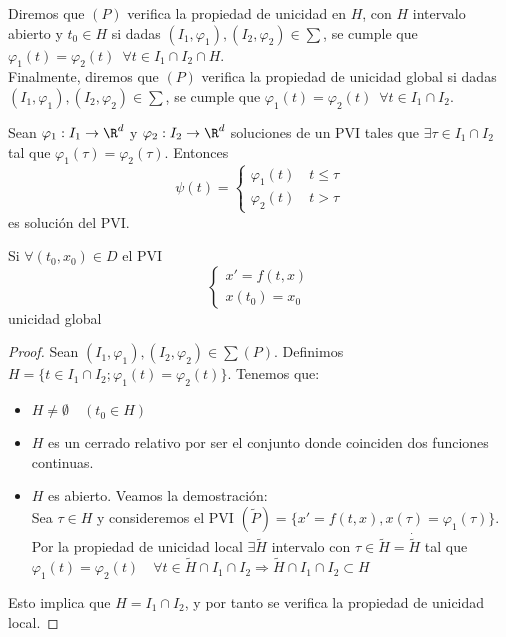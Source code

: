 \documentclass{article}
\begin{document}
Diremos que $(P)$ verifica la propiedad de unicidad en $H$, con $H$ intervalo abierto
y $t_0 \in H$ si dadas $(I_1, \varphi_1), (I_2, \varphi_2) \in \sum$, se cumple que
$\varphi_1(t) = \varphi_2(t)\,\,\, \forall t \in I_1 \cap I_2 \cap H$.\\

Finalmente, diremos que $(P)$ verifica la propiedad de unicidad global si dadas
$(I_1, \varphi_1), (I_2, \varphi_2) \in \sum$, se cumple que $\varphi_1(t) =
\varphi_2(t)\,\,\, \forall t \in I_1 \cap I_2$.\\

\begin{lemma}
    Sean $\varphi_1: I_1 \to \R^d$ y $\varphi_2: I_2 \to \R^d$ soluciones de un PVI
    tales que $\exists \tau \in I_1 \cap I_2$ tal que $\varphi_1(\tau) = \varphi_2(\tau)$.
    Entonces
    \[
    \psi(t) = \left\{
    \begin{array}{l}
        \varphi_1(t) \quad t \leq \tau \\
        \varphi_2(t) \quad t > \tau
    \end{array}
    \right.
    \]
    es solución del PVI.
\end{lemma}

\begin{lemma}
    Si $\forall (t_0, x_0) \in D$ el PVI
    \[
    \left\{
    \begin{array}{l}
        x' = f(t,x) \\
        x(t_0) = x_0
    \end{array}
    \right.
    \]
    unicidad global
\end{lemma}

\begin{proof}
    Sean $(I_1, \varphi_1), (I_2, \varphi_2) \in \sum (P)$. Definimos $H = \{ t \in
    I_1 \cap I_2; \varphi_1(t) = \varphi_2(t)\}$. Tenemos que:
    \begin{itemize}
        \item $H \neq \emptyset \quad (t_0 \in H)$
        \item $H$ es un cerrado relativo por ser el conjunto donde coinciden dos
        funciones continuas.
        \item $H$ es abierto. Veamos la demostración:\\
        Sea $\tau \in H$ y consideremos el PVI $(\tilde{P})=\{x'= f(t, x), x(\tau)
        = \varphi_1(\tau)\}$. Por la propiedad de unicidad local $\exists \tilde{H}$
        intervalo con $\tau \in \tilde{H} = \dot{\tilde{H}}$ tal que $\varphi_1(t) =
        \varphi_2(t) \quad \forall t \in \tilde{H} \cap I_1 \cap I_2 \Rightarrow
        \tilde{H} \cap I_1 \cap I_2 \subset H$
    \end{itemize}
    Esto implica que $H = I_1 \cap I_2$, y por tanto se verifica la propiedad de
    unicidad local.
\end{proof}
\end{document}

